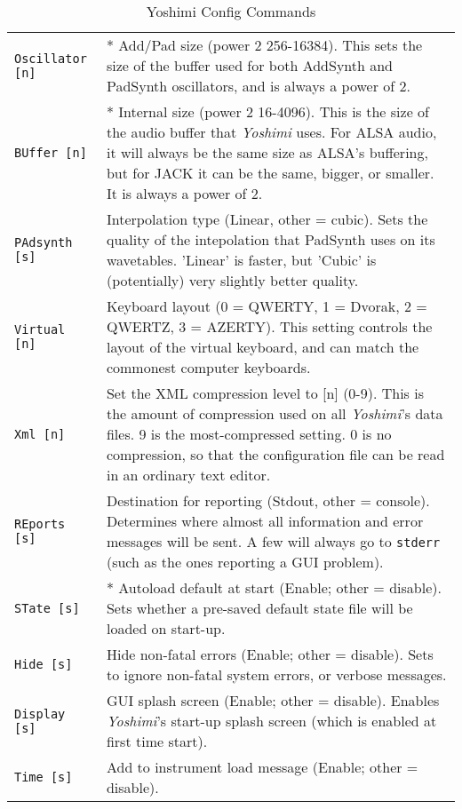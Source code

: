 \begin{center}
\begin{longtable}{p{4cm} p{10cm}}
\caption[Yoshimi Config Commands]{Yoshimi Config Commands} \\

\texttt{Oscillator [n]} &
   * Add/Pad size (power 2 256-16384).
   This sets the size of the buffer used for both AddSynth and PadSynth
   oscillators, and is always a power of 2.  \\
\texttt{BUffer [n]} &
   * Internal size (power 2 16-4096).
   This is the size of the audio buffer that \textsl{Yoshimi} uses.  For ALSA
   audio, it will always be the same size as ALSA's buffering, but for JACK it
   can be the same, bigger, or smaller. It is always a power of 2. \\
\texttt{PAdsynth [s]} &
   Interpolation type (Linear, other = cubic).
   Sets the quality of the intepolation that PadSynth uses on its wavetables.
   'Linear' is faster, but 'Cubic' is (potentially) very slightly better
   quality. \\
\texttt{Virtual [n]} &
   Keyboard layout (0 = QWERTY, 1 = Dvorak, 2 = QWERTZ, 3 = AZERTY).
   This setting controls the layout of the virtual keyboard, and can match the
   commonest computer keyboards. \\
\texttt{Xml [n]} &
   Set the XML compression level to [n] (0-9).
   This is the amount of compression used on all
   \textsl{Yoshimi}'s data files. 9 is the most-compressed setting.
   0 is no compression, so that the configuration file
   can be read in an ordinary text editor. \\
\texttt{REports [s]} &
   Destination for reporting (Stdout, other = console).
   Determines where almost all information and error messages will be sent. A
   few will always go to \texttt{stderr} (such as the ones reporting a GUI
   problem). \\
\texttt{STate [s]} &
   * Autoload default at start (Enable; other = disable).
   Sets whether a pre-saved default state file will be loaded on start-up. \\
\texttt{Hide [s]} &
   Hide non-fatal errors (Enable; other = disable).
   Sets to ignore non-fatal system errors, or verbose messages. \\
\texttt{Display [s]} &
   GUI splash screen (Enable; other = disable).
   Enables \textsl{Yoshimi}'s start-up splash screen (which is
   enabled at first time start). \\
\texttt{Time [s]} &
   Add to instrument load message (Enable; other = disable).

\end{longtable}
\end{center}
